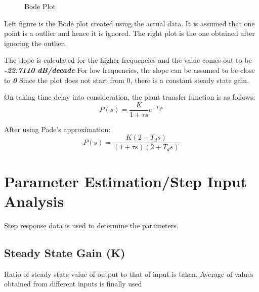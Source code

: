 \documentclass{article}
\begin{document}
\begin{figure}[h]%
    \centering
    \qquad
    \caption{Bode Plot}%
    \label{fig:bode}%
\end{figure}

Left figure is the Bode plot created using the actual data. It is assumed that one point is a outlier and hence it is ignored. The right plot is the one obtained after ignoring the outlier.

The slope is calculated for the higher frequencies and the value comes out to be \textbf{\textit{-22.7110 dB/decade}}
For low frequencies, the slope can be assumed to be close to \textbf{\textit{0}}
Since the plot does not start from 0, there is a constant steady state gain.

On taking time delay into consideration, the plant transfer function is as follows:
\[P(s) = \frac{K}{1 + \tau s} e^{-T_d s}\]

After using Pade’s approximation:
\[P(s) = \frac{K(2 - T_d s)}{(1 + \tau s)(2 + T_d s)}\]


\section{Parameter Estimation/Step Input Analysis}
Step response data is used to determine the parameters.

\subsection{Steady State Gain (K)}
Ratio of steady state value of output to that of input is taken. Average of values obtained from different inputs is finally used
\end{document}
